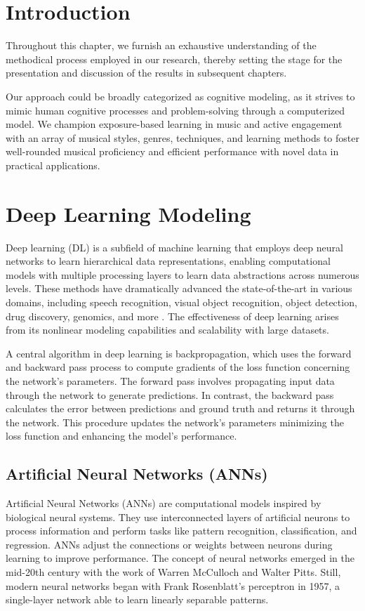 \section{Introduction}


Throughout this chapter, we furnish an exhaustive understanding of the methodical process employed in our research, thereby setting the stage for the presentation and discussion of the results in subsequent chapters.

Our approach could be broadly categorized as cognitive modeling, as it strives to mimic human cognitive processes and problem-solving through a computerized model. We champion exposure-based learning in music and active engagement with an array of musical styles, genres, techniques, and learning methods to foster well-rounded musical proficiency and efficient performance with novel data in practical applications.

\section{Deep Learning Modeling}


Deep learning (DL) is a subfield of machine learning that employs deep neural networks to learn hierarchical data representations, enabling computational models with multiple processing layers to learn data abstractions across numerous levels. These methods have dramatically advanced the state-of-the-art in various domains, including speech recognition, visual object recognition, object detection, drug discovery, genomics, and more \cite{LeCun2015DeepLearning}. The effectiveness of deep learning arises from its nonlinear modeling capabilities and scalability with large datasets.

A central algorithm in deep learning is backpropagation, which uses the forward and backward pass process to compute gradients of the loss function concerning the network's parameters. The forward pass involves propagating input data through the network to generate predictions. In contrast, the backward pass calculates the error between predictions and ground truth and returns it through the network. This procedure updates the network's parameters minimizing the loss function and enhancing the model's performance.



\subsection{Artificial Neural Networks (ANNs)}
Artificial Neural Networks (ANNs) are computational models inspired by biological neural systems. They use interconnected layers of artificial neurons to process information and perform tasks like pattern recognition, classification, and regression. ANNs adjust the connections or weights between neurons during learning to improve performance. The concept of neural networks emerged in the mid-20th century with the work of Warren McCulloch and Walter Pitts. Still, modern neural networks began with Frank Rosenblatt's perceptron in 1957, a single-layer network able to learn linearly separable patterns.

